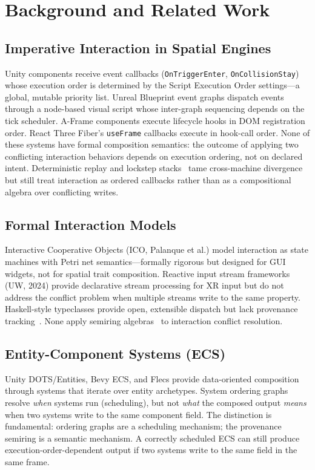 \documentclass[sigconf,nonacm]{acmart}
\begin{document}
\section{Background and Related Work}
\label{sec:related}

\subsection{Imperative Interaction in Spatial Engines}
Unity components receive event callbacks
(\texttt{OnTriggerEnter}, \texttt{OnCollisionStay}) whose
execution order is determined by the Script Execution Order
settings---a global, mutable priority list. Unreal Blueprint
event graphs dispatch events through a node-based visual
script whose inter-graph sequencing depends on the tick
scheduler. A-Frame components execute lifecycle hooks in DOM
registration order. React Three Fiber's \texttt{useFrame}
callbacks execute in hook-call order. None of these systems
have formal composition semantics: the outcome of applying
two conflicting interaction behaviors depends on execution
ordering, not on declared intent.
Deterministic replay and lockstep stacks~\cite{lockstep2001} tame
cross-machine divergence but still treat interaction as ordered
callbacks rather than as a compositional algebra over conflicting writes.

\subsection{Formal Interaction Models}
Interactive Cooperative Objects (ICO, Palanque et al.) model
interaction as state machines with Petri net
semantics---formally rigorous but designed for GUI widgets,
not for spatial trait composition. Reactive input stream
frameworks (UW, 2024) provide declarative stream processing
for XR input but do not address the conflict problem when
multiple streams write to the same property. Haskell-style
typeclasses provide open, extensible dispatch but lack
provenance tracking~\cite{provone2014}. None apply semiring
algebras~\cite{green-semiring2007} to interaction conflict resolution.

\subsection{Entity-Component Systems (ECS)}
Unity DOTS/Entities, Bevy ECS, and Flecs provide
data-oriented composition through systems that iterate over
entity archetypes. System ordering graphs resolve
\emph{when} systems run (scheduling), but not \emph{what}
the composed output \emph{means} when two systems write to
the same component field. The distinction is fundamental:
ordering graphs are a scheduling mechanism; the provenance
semiring is a semantic mechanism. A correctly scheduled ECS
can still produce execution-order-dependent output if two
systems write to the same field in the same frame.
\end{document}
